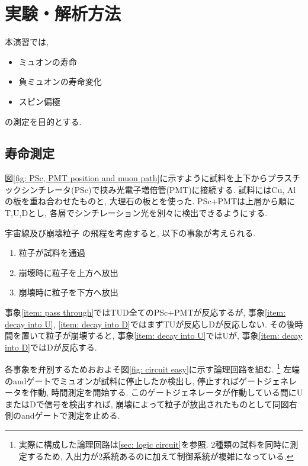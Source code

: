 \documentclass[dvipdfmx]{jsarticle}
\begin{document}
\section{実験・解析方法}

本演習では,
\begin{itemize}
    \item ミュオンの寿命
    \item 負ミュオンの寿命変化
    \item スピン偏極
\end{itemize}
の測定を目的とする.

\subsection{寿命測定}
\label{sec: method: life}

図\ref{fig: PSc, PMT position and muon path}に示すように試料を上下からプラスチックシンチレータ(PSc)で挟み光電子増倍管(PMT)に接続する.
試料にはCu, Alの板を重ね合わせたものと, 大理石の板とを使った.
PSc+PMTは上層から順にT,U,Dとし, 各層でシンチレーション光を別々に検出できるようにする.

宇宙線及び崩壊粒子
の飛程を考慮すると, 以下の事象が考えられる.
\renewcommand{\theenumi}{(\alph{enumi})}
\begin{enumerate}
    \item \label{item: pass through}粒子が試料を通過
    \item \label{item: decay into U}崩壊時に粒子を上方へ放出
    \item \label{item: decay into D}崩壊時に粒子を下方へ放出
\end{enumerate}
事象\ref{item: pass through}ではTUD全てのPSc+PMTが反応するが, 事象\ref{item: decay into U}, \ref{item: decay into D}ではまずTUが反応しDが反応しない.
その後時間を置いて粒子が崩壊すると, 事象\ref{item: decay into U}ではUが, 事象\ref{item: decay into D}ではDが反応する.

各事象を弁別するためおおよそ図\ref{fig: circuit easy}に示す論理回路を組む.
\footnote{実際に構成した論理回路は\ref{sec: logic circuit}を参照. 2種類の試料を同時に測定するため, 入出力が2系統あるのに加えて制御系統が複雑になっている. }
左端のandゲートでミュオンが試料に停止したか検出し, 停止すればゲートジェネレータを作動, 時間測定を開始する.
このゲートジェネレータが作動している間にUまたはDで信号を検出すれば, 崩壊によって粒子が放出されたものとして同図右側のandゲートで測定を止める.
\end{document}
